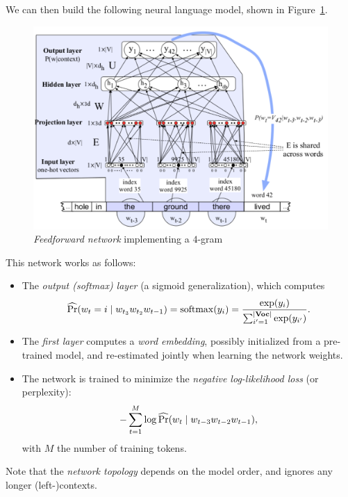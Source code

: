 We can then build the following neural language model, shown in Figure~\ref{fig:neural_language_model}.
\begin{figure}[!hbtp]
	\centering
	\includegraphics[width=\textwidth]{img/neural_language_model}
	\caption{\emph{Feedforward network} implementing a \(4\)-gram}
	\label{fig:neural_language_model}
\end{figure}
This network works as follows:
\begin{itemize}
	\item The \emph{output (softmax) layer} (a sigmoid generalization), which computes
	\[
	\operatorname{\widehat{\Pr}}(w_t = i \mid w_{t_3} w_{t_2} w_{t-1}) = \mathrm{softmax}(y_i) = \frac{\exp(y_i)}{\sum_{i' = 1}^{{\left\lvert\mathbf{Voc}\right\lvert}} \exp(y_{i'})}.
	\]
	\item The \emph{first layer} computes a \emph{word embedding}, possibly initialized from a pre-trained model, and re-estimated jointly when learning the network weights.
	\item The network is trained to minimize the \emph{negative log-likelihood loss} (or perplexity):
	\[
	-\sum_{t = 1}^M \log \operatorname{\widehat{\Pr}}(w_t \mid w_{t-3} w_{t-2} w_{t-1}),
	\]
	with \(M\) the number of training tokens.
\end{itemize}
Note that the \emph{network topology} depends on the model order, and ignores any longer (left-)contexts.

